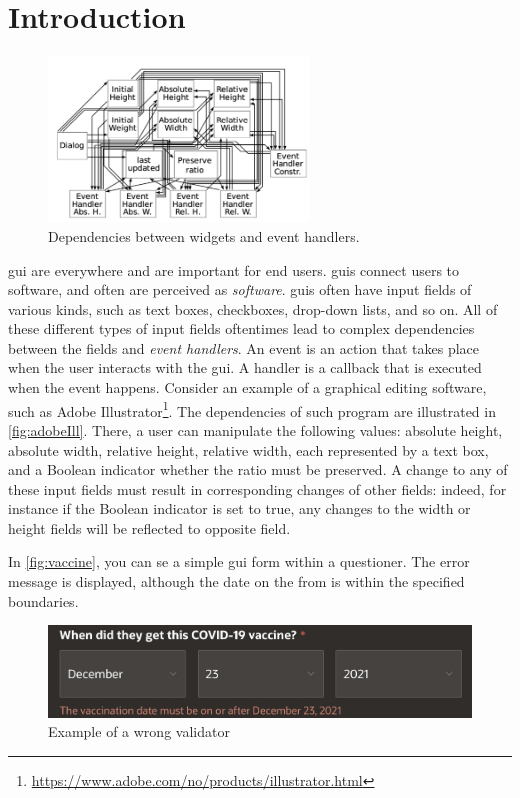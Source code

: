 \chapter{Introduction}

\begin{figure}
    \includegraphics[width=6.9cm, frame]{figures/adobeIll.png}
    \caption{Dependencies between widgets and event handlers.}
    \label{fig:adobeIll}
\end{figure}

\gls{gui} are everywhere and are important for end users. \gls{gui}s connect users to software, and often are perceived as \emph{software}. \gls{gui}s often have input fields of various kinds, such as text boxes, checkboxes, drop-down lists, and so on. All of these different types of input fields oftentimes lead to complex dependencies between the fields and \textit{event handlers}. An event is an action that takes place when the user interacts with the \gls{gui}. A handler is a callback that is executed when the event happens. Consider an example of a graphical editing software, such as Adobe Illustrator\footnote{\url{https://www.adobe.com/no/products/illustrator.html}}. The dependencies of such program are illustrated in \autoref{fig:adobeIll}. There, a user can manipulate the following values: absolute height, absolute width, relative height, relative width, each represented by a text box, and a Boolean indicator whether the ratio must be preserved. A change to any of these input fields must result in corresponding changes of other fields: indeed, for instance if the Boolean indicator is set to true, any changes to the width or height fields will be reflected to opposite field. 

In \autoref{fig:vaccine}, you can se a simple \gls{gui} form within a questioner. The error message is displayed, although the date on the from is within the specified boundaries.

\begin{figure}
    \centering
    \includegraphics[scale=0.35, frame]{figures/vaccine.jpeg}
    \caption{Example of a wrong validator}
    \label{fig:vaccine}
\end{figure}

